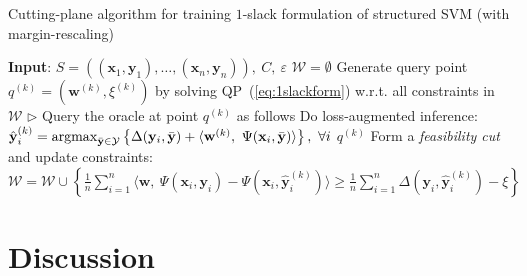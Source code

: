 \begin{algorithm}[htbp]
\caption{Cutting-plane algorithm for training $1$-slack formulation of structured SVM (with margin-rescaling)}
\label{alg:1slacktrain}
\begin{algorithmic}[1]
\STATE \textbf{Input}: $S = \left( (\mathbf{x}_1, \mathbf{y}_1), \dots, (\mathbf{x}_n, \mathbf{y}_n) \right),~ C,~ \varepsilon$
\STATE $\mathcal{W} = \emptyset$
{}
    \STATE Generate query point $q^{(k)} = (\mathbf{w}^{(k)}, \xi^{(k)})$ by solving QP~(\ref{eq:1slackform}) w.r.t. all constraints in $\mathcal{W}$
    \STATE $\triangleright$ Query the oracle at point $q^{(k)}$ as follows
    \STATE Do loss-augmented inference:~
           $\hat{\mathbf{y}}_i^{(k)} = \operatorname*{argmax}_{\bar{\mathbf{y}} \in \mathcal{Y}} \left\{ \Delta(\mathbf{y}_i, \bar{\mathbf{y}}) + 
            \langle \mathbf{w}^{(k)},~ \Psi(\mathbf{x}_i, \bar{\mathbf{y}}) \rangle \right\},~ \forall i$
        \RETURN $q^{(k)}$
    \ELSE
        \STATE Form a \emph{feasibility cut} and update constraints:~
               $\mathcal{W} = \mathcal{W} \cup \left\{ 
                \frac{1}{n} \sum_{i=1}^n \langle \mathbf{w},~ \Psi(\mathbf{x}_i, \mathbf{y}_i) - \Psi(\mathbf{x}_i, \hat{\mathbf{y}}_i^{(k)}) \rangle \ge 
                \frac{1}{n} \sum_{i=1}^n \Delta(\mathbf{y}_i, \hat{\mathbf{y}}_i^{(k)}) - \xi \right\}$
    \ENDIF
\ENDFOR
\end{algorithmic}
\end{algorithm}


\section{Discussion}
\label{sec:ssvm_discussion}

